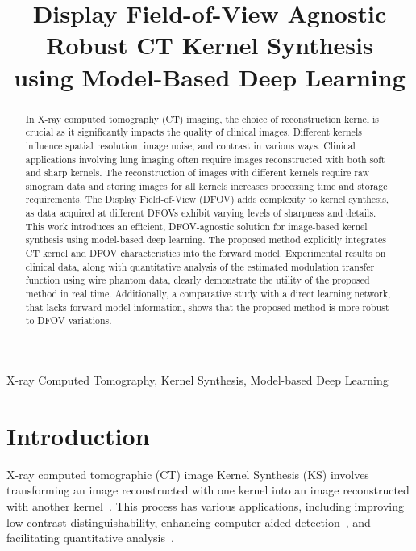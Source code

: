 \documentclass{article}
\title{Display Field-of-View Agnostic Robust CT Kernel Synthesis \\using Model-Based Deep Learning}
\begin{document}
\maketitle

\begin{abstract}
	
In X-ray computed tomography (CT) imaging, the choice of reconstruction kernel is crucial as it significantly impacts the quality of clinical images. Different kernels influence spatial resolution, image noise, and contrast in various ways. Clinical applications involving lung imaging often require images reconstructed with both soft and sharp kernels. The reconstruction of images with different kernels require raw sinogram data and storing images for all kernels increases processing time and storage requirements. The Display Field-of-View (DFOV) adds complexity to kernel synthesis, as data acquired at different DFOVs exhibit varying levels of sharpness and details. This work introduces an efficient, DFOV-agnostic solution for  image-based  kernel synthesis using model-based deep learning. The proposed method explicitly integrates CT kernel and DFOV characteristics into the forward model. Experimental results on clinical data, along with quantitative analysis of the estimated modulation transfer function using wire phantom data, clearly demonstrate the utility of the proposed method in real time. Additionally, a comparative study with a direct learning network, that lacks forward model information, shows that the proposed method is more robust to DFOV variations.
\end{abstract}
%
\begin{keywords}
X-ray Computed Tomography, Kernel Synthesis, Model-based Deep Learning
\end{keywords}
%
\section{Introduction}
\label{sec:intro}
X-ray computed tomographic (CT) image Kernel Synthesis (KS) involves transforming an image reconstructed with one kernel into an image reconstructed with another kernel~\cite{radiologyct,imageQuality,ohkubo2016Filtering}. This process has various applications, including improving low contrast distinguishability, enhancing computer-aided detection~\cite{icnodulenet}, and facilitating quantitative analysis~\cite{tanabe2022kernel}.
\end{document}

